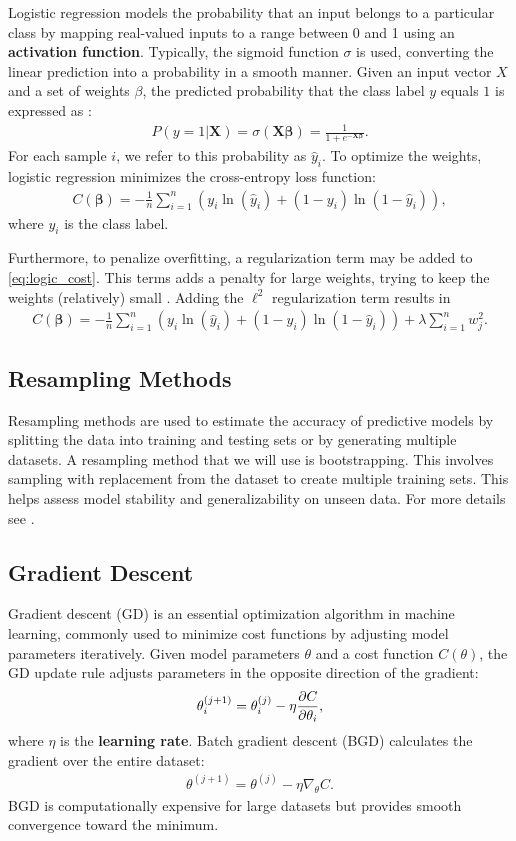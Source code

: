 \documentclass[%
reprint,s
amsmath,amssymb,
aps,
]{revtex4-2}
\begin{document}
Logistic regression models the probability that an input belongs to a particular class by mapping real-valued inputs to a range between 0 and 1 using an \textbf{activation function}. Typically, the sigmoid function \(\sigma\) is used, converting the linear prediction into a probability in a smooth manner. Given an input vector \(X\) and a set of weights \(\beta\), the predicted probability that the class label \(y\) equals \(1\) is expressed as \cite{fys-stk}:
\begin{align}
	P(y=1|\bm X)=\sigma(\bm X\bm\beta)=\frac{1}{1+e^{-\bm X\bm\beta}}.
\end{align}
For each sample \(i\), we refer to this probability as \(\hat{y}_i\). To optimize the weights, logistic regression minimizes the cross-entropy loss function:
\begin{align}	\label{eq:logic_cost}
	C(\bm\beta)=-\frac1n\sum_{i=1}^n\left(y_i \ln(\hat y_i)+(1-y_i)\ln(1-\hat y_i) \right),
\end{align}
where $y_i$ is the class label. 

Furthermore, to penalize overfitting, a regularization term may be added to \eqref{eq:logic_cost}. This terms adds a penalty for large weights, trying to keep the weights (relatively) small \cite{fys-stk}. Adding the \(\ell^2\) regularization term results in
\begin{align}
	C(\bm\beta)=-\frac1n\sum_{i=1}^n\left(y_i \ln(\hat y_i)+(1-y_i)\ln(1-\hat y_i) \right) + \lambda\sum\limits_{i=1}^{n}w_{j}^{2}.
\end{align}

\subsection{Resampling Methods}
Resampling methods are used to estimate the accuracy of predictive models by splitting the data into training and testing sets or by generating multiple datasets. A resampling method that we will use is bootstrapping. This involves sampling with replacement from the dataset to create multiple training sets. This helps assess model stability and generalizability on unseen data. For more details see \cite{project1}.

\subsection{Gradient Descent}	\label{sec:gradient_descent}
Gradient descent (GD) is an essential optimization algorithm in machine learning, commonly used to minimize cost functions by adjusting model parameters iteratively. Given model parameters $\theta$ and a cost function $C(\theta)$, the GD update rule adjusts parameters in the opposite direction of the gradient:
\begin{align}
	\theta_i^{(j+1)}=\theta_i^{(j)}-\eta\pdv{C}{\theta_i},
\end{align}
where $\eta$ is the \textbf{learning rate}. Batch gradient descent (BGD) calculates the gradient over the entire dataset:
\begin{align}
	\theta^{(j+1)}=\theta^{(j)}-\eta\nabla_\theta C.
\end{align}
BGD is computationally expensive for large datasets but provides smooth convergence toward the minimum.
\end{document}
